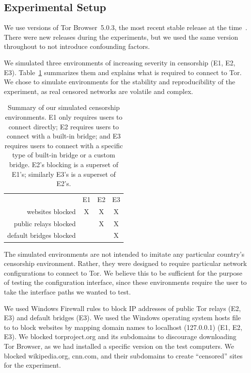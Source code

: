 \documentclass[USenglish,oneside,twocolumn]{article}
\begin{document}
\subsection{Experimental Setup}
\label{sec:environments}
We use versions of Tor Browser~5.0.3, 
the most recent stable release at the time~\cite{torbrowser-503}.
There were new releases during the experiments, but
we used the same version throughout to not introduce
confounding factors.

We simulated three environments of increasing severity in censorship (E1, E2, E3).
Table~\ref{tab:environments} summarizes them and explains what is required to connect to Tor. We chose to 
simulate environments for the stability and reproducibility of the 
experiment, as real censored networks are volatile and complex. 

\begin{table}[t]
\centering
\begin{tabular}{r c c c}
& E1 & E2 & E3 \\
websites blocked & X & X & X \\
public relays blocked & & X & X \\
default bridges blocked & & & X \\
\end{tabular}
\caption{
Summary of our simulated censorship environments.
E1 only requires users to connect directly;
E2 requires users to connect with a built-in bridge;
and E3 requires users to connect with a specific type of built-in bridge
or a custom bridge.
E2's blocking is a superset of E1's;
similarly E3's is a superset of E2's.
}
\label{tab:environments}
\end{table}

The simulated environments are not intended to imitate any particular country's censorship environment. Rather, they were designed to require particular network configurations
to connect to Tor. We believe this to be sufficient for the purpose of testing the configuration interface, since these environments require the user to take the interface paths we wanted to test. 

We used Windows Firewall rules to block IP addresses of public Tor relays (E2, E3) and default bridges (E3). 
We used the Windows operating system hosts file to to block websites by
mapping domain names to localhost (127.0.0.1) (E1, E2, E3). We blocked torproject.org and its subdomains to discourage downloading Tor Browser, as we had installed a specific version on the test computers.  We blocked wikipedia.org, cnn.com, and their subdomains to create ``censored'' sites for the experiment. 
\end{document}
